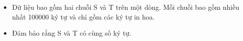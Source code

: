 \begin{itemize}
	\item     Dữ liệu bao gồm hai chuỗi S và T trên một dòng. Mỗi chuỗi bao gồm nhiều nhất 100000 ký tự và chỉ gồm các ký tự in hoa.   
	\item     Đảm bảo rằng S và T có cùng số ký tự.   
\end{itemize}

\